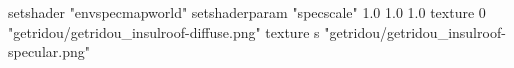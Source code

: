 setshader "envspecmapworld"
setshaderparam "specscale" 1.0 1.0 1.0
texture 0 "getridou/getridou_insulroof-diffuse.png"
texture s "getridou/getridou_insulroof-specular.png"
